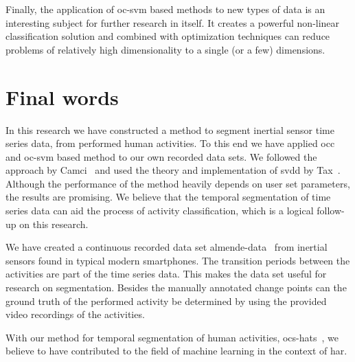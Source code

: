 Finally, the application of \gls{oc-svm} based methods to new types of data is an interesting subject for further research in itself.
It creates a powerful non-linear classification solution and combined with optimization techniques can reduce problems of relatively high dimensionality to a single (or a few) dimensions.

\section{Final words}\label{sec:final_remarks}
In this research we have constructed a method to segment inertial sensor time series data, from performed human activities.
To this end we have applied \gls{occ} and \gls{oc-svm} based method to our own recorded data sets.
We followed the approach by Camci~\cite{camci2010change} and used the theory and implementation of \gls{svdd} by Tax~\cite{tax2001one,Ddtools2013}.
Although the performance of the method heavily depends on user set parameters, the results are promising.
We believe that the temporal segmentation of time series data can aid the process of activity classification, which is a logical follow-up on this research.

We have created a continuous recorded data set \gls{almende-data}~\cite{vlasveld2014acras} from inertial sensors found in typical modern smartphones.
The transition periods between the activities are part of the time series data.
This makes the data set useful for research on segmentation.
Besides the manually annotated change points can the ground truth of the performed activity be determined by using the provided video recordings of the activities.

With our method for temporal segmentation of human activities, \gls{ocs-hats}~\cite{vlasveld2014hats}, we believe to have contributed to the field of machine learning in the context of \acrlong{har}.

